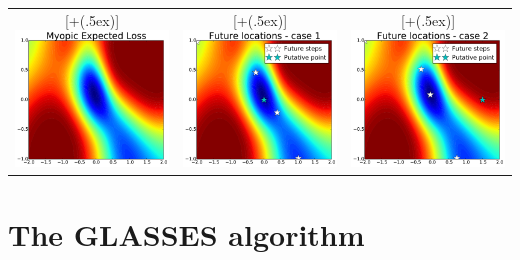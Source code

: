 \documentclass[twoside]{article}
\newcommand*{\addheight}[2][.5ex]{%
  \raisebox{0pt}[\dimexpr\height+(#1)\relax]{#2}%
}
\begin{document}
\begin{table}[t!]
\begin{tabular}{ccc}
      \addheight{\includegraphics[width=54mm]{bo_1step.pdf}} &
      \addheight{\includegraphics[width=54mm]{predicted_locations1.pdf}}  &
      \addheight{\includegraphics[width=54mm]{predicted_locations2.pdf}}
\end{tabular}
\end{table}

 \section{The GLASSES algorithm}\label{sec:glasses}
\end{document}
